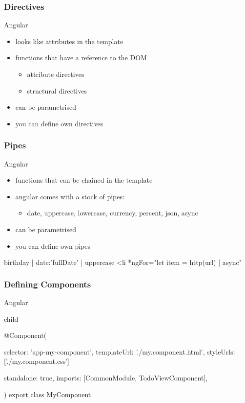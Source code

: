 \begin{frame}[fragile] \frametitle{Directives}
Angular
\begin{itemize}
  \item looks like attributes in the template
  \item functions that have a reference to the DOM
  \begin{itemize}
    \item attribute directives
    \item structural directives
  \end{itemize}
  \item can be parametrised
  \item you can define own directives
\end{itemize}
\end{frame}

\begin{frame}[fragile] \frametitle{Pipes}
Angular
\begin{itemize}
  \item functions that can be chained in the template
  \item angular comes with a stock of pipes:
  \begin{itemize}
    \item  date, uppercase, lowercase, currency, percent, json, async
  \end{itemize}
  \item can be parametrised
  \item you can define own pipes
\end{itemize}
\begin{CodeBox}{}
{{  birthday | date:'fullDate' | uppercase}}
{{  <li *ngFor="let item = http(url) | async"}}
\end{CodeBox}
\end{frame}

\begin{frame}[fragile] \frametitle{Defining Components}
Angular
\begin{CodeBox}{child}

@Component({
  selector: 'app-my-component',
  templateUrl: './my.component.html',
  styleUrls: ['./my.component.css']

  standalone: true,
  imports: [CommonModule, TodoViewComponent],
})
export class MyComponent { }
\end{CodeBox}
\end{frame}


